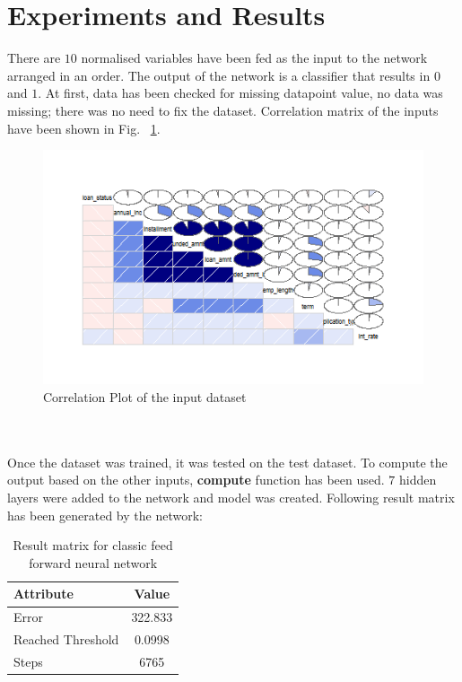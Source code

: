 \documentclass{article}[]
\begin{document}
\section{Experiments and Results}
There are $10$ normalised variables have been fed as the input to the network arranged in an order. The output of the network is a classifier that results in $0$ and $1$. At first, data has been checked for missing datapoint value, no data was missing; there was no need to fix the dataset. Correlation matrix of the inputs have been shown in Fig.~ \ref{fig:image1}.
\begin{figure}[!htb]
\centering
\includegraphics[width=1\textwidth]{image2.png}
\caption{Correlation Plot of the input dataset}
\label{fig:image1}
\end{figure}\\\\
Once the dataset was trained, it was tested on the test dataset. To compute the output based on the other inputs, \textbf{compute} function has been used. $7$ hidden layers were added to the network and model was created. Following result matrix has been generated by the network:
\begin{table} 
\caption{Result matrix for classic feed forward neural network} %
\centering      %
\begin{tabular}{l|c}  %
\hline                      %
{\bf Attribute}&{\bf Value}\\
\hline                    %
Error & 322.833\\
Reached Threshold & 0.0998\\
Steps & 6765\\
\hline     %
\end{tabular} 
\label{table:params} 
\end{table} \\\\
\end{document}

